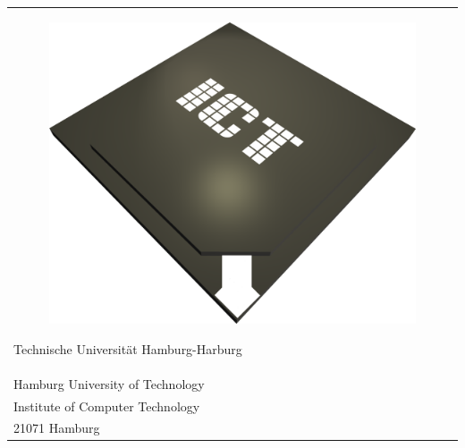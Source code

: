 \begin{tabular}{p{\textwidth}}
\begin{figure} %
\centering
\includegraphics[scale=0.25]{figures/ictlogo.png}
\end{figure}
Technische Universität Hamburg-Harburg\\
Hamburg University of Technology\\
Institute of Computer Technology \\
21071 Hamburg

\end{tabular}


